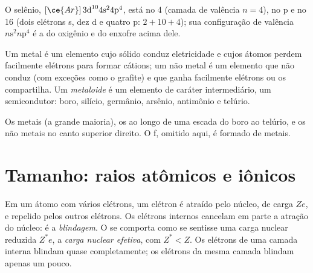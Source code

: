 \begin{example}\label{ex:b1:periodicity:position}
O selênio, $[\ce{Ar}]\,3\text{d}^{10} 4\text{s}^2 4\text{p}^4$, está no
 4 (camada de valência $n = 4$), no  p e no  16 (dois
elétrons s, dez d e quatro p: $2 + 10 + 4$); sua configuração de valência
$n\text{s}^2 n\text{p}^4$ é a do oxigênio e do enxofre acima dele.
\end{example}

\begin{definition}\label{def:b1:periodicity:metalloid}
Um metal é um elemento cujo sólido conduz eletricidade e cujos átomos
perdem facilmente elétrons para formar cátions; um não metal é um
elemento que não conduz (com exceções como o grafite) e que ganha
facilmente elétrons ou os compartilha. Um \emph{metaloide} é um
elemento de caráter intermediário, um semicondutor: boro, silício,
germânio, arsênio, antimônio e telúrio.
\end{definition}

\begin{omfigure}
\omperiodictable[colour=metals, legend, f block=false]

{\small Os metais (a grande maioria), os  ao longo de uma
escada do boro ao telúrio, e os não metais no canto superior direito. O
 f, omitido aqui, é formado de metais.}
\end{omfigure}

\section{Tamanho: raios atômicos e iônicos}

\begin{definition}\label{def:b1:periodicity:screening}
Em um átomo com vários elétrons, um elétron é atraído pelo núcleo, de
carga $Ze$, e repelido pelos outros elétrons. Os elétrons internos
cancelam em parte a atração do núcleo: é a
\emph{blindagem}. O  se comporta como se
sentisse uma carga nuclear reduzida $Z^{*}e$, a \emph{carga nuclear
efetiva}, com $Z^{*} < Z$. Os elétrons de
uma camada interna blindam quase completamente; os elétrons da mesma
camada blindam apenas um pouco.
\end{definition}

